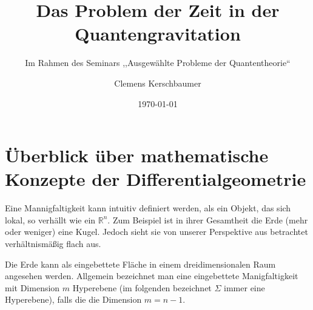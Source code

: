 \documentclass{scrartcl}
\title{Das Problem der Zeit in der Quantengravitation}
\subtitle{Im Rahmen des Seminars ,,Ausgewählte Probleme der Quantentheorie``}
\author{Clemens Kerschbaumer}
\date{\today}
\begin{document}
	\maketitle
	\section{Überblick über mathematische Konzepte der Differentialgeometrie}
		Eine Mannigfaltigkeit kann intuitiv definiert werden, als ein Objekt, das sich lokal, so verhällt wie ein $\mathbb{R}^n$. Zum Beispiel
		ist in ihrer Gesamtheit die Erde (mehr oder weniger) eine Kugel. Jedoch sieht sie von unserer Perspektive aus betrachtet verhältnismäßig flach aus.
		
		Die Erde kann als eingebettete Fläche in einem dreidimensionalen Raum angesehen werden.
		Allgemein bezeichnet man eine eingebettete Manigfaltigkeit mit Dimension $m$ Hyperebene 
		(im folgenden bezeichnet $\Sigma$ immer eine Hyperebene), falls die die Dimension $m=n-1$. 
		
\end{document}
